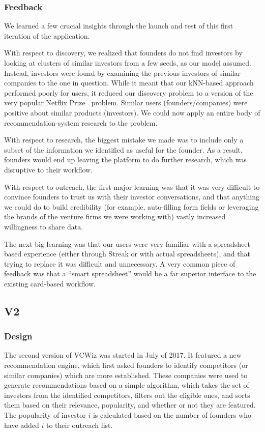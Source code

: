\subsubsection{Feedback}

We learned a few crucial insights through the launch and test of this first iteration of the application.

With respect to discovery, we realized that founders do not find investors by looking at clusters of similar investors from a few seeds, as our model assumed. Instead, investors were found by examining the previous investors of similar companies to the one in question. While it meant that our kNN-based approach performed poorly for users, it reduced our discovery problem to a version of the very popular Netflix Prize~\cite{netflixpize} problem. Similar users (founders/companies) were positive about similar products (investors). We could now apply an entire body of recommendation-system research to the problem.

With respect to research, the biggest mistake we made was to include only a subset of the information we identified as useful for the founder. As a result, founders would end up leaving the platform to do further research, which was disruptive to their workflow.

With respect to outreach, the first major learning was that it was very difficult to convince founders to trust us with their investor conversations, and that anything we could do to build credibility (for example, auto-filling form fields or leveraging the brands of the venture firms we were working with) vastly increased willingness to share data.

The next big learning was that our users were very familiar with a spreadsheet-based experience (either through Streak or with actual spreadsheets), and that trying to replace it was difficult and unnecessary. A very common piece of feedback was that a ``smart spreadsheet'' would be a far superior interface to the existing card-based workflow.

\subsection{V2}

\subsubsection{Design}

The second version of VCWiz was started in July of 2017. It featured a new recommendation engine, which first asked founders to identify competitors (or similar companies) which are more established. These companies were used to generate recommendations based on a simple algorithm, which takes the set of investors from the identified competitors, filters out the eligible ones, and sorts them based on their relevance, popularity, and whether or not they are featured. The popularity of investor $i$ is calculated based on the number of founders who have added $i$ to their outreach list.

